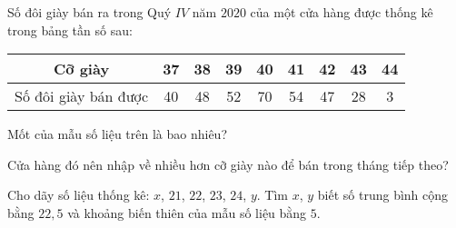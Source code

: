 \begin{bt}%
	Số đôi giày bán ra trong Quý $IV$ năm $2020$ của một cửa hàng được thống kê trong bảng tần số sau:\\
	\begin{center}
	\begin{tabular}{|c|c|c|c|c|c|c|c|c|}
	\hline 
	Cỡ giày &37&38&39&40&41&42&43&44 \\ 
	\hline 
	Số đôi giày bán được &40&48&52&70&54&47&28&3 \\ 
	\hline 
	\end{tabular} 
	\end{center}
	\begin{listEX}[1]
		\item Mốt của mẫu số liệu trên là bao nhiêu?
		\item Cửa hàng đó nên nhập về nhiều hơn cỡ giày nào để bán trong tháng tiếp theo?
	\end{listEX}
\end{bt}

\begin{bt}%
	Cho dãy số liệu thống kê: $x$, $21$, $22$, $23$, $24$, $y$. Tìm $x$, $y$ biết số trung bình cộng bằng $22,5$ và khoảng biến thiên của mẫu số liệu bằng $5$. 
\end{bt}

